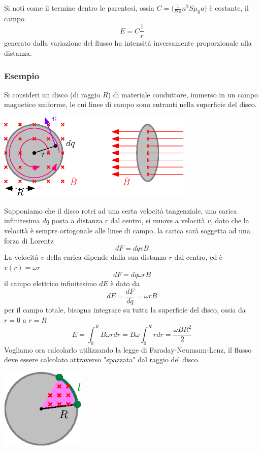 \documentclass[10pt, letterpaper]{report}
\begin{document}
Si noti come il termine dentro le parentesi, ossia $C=\Big(\frac{1}{l2\pi }n^2S\mu_0a\Big)$ è costante, il campo $$ E=C\frac{1}{r}$$
generato dalla variazione del flusso ha intensità inversamente proporzionale alla distanza. 
\subsubsection{Esempio}
Si consideri un disco (di raggio $R$) di materiale conduttore, immerso in un campo magnetico uniforme, le cui linee di campo sono entranti nella superficie del disco.\begin{center}
    \includegraphics[width=0.7\textwidth ]{images/discoMagnetico.eps}
\end{center}
Supponiamo che il disco rotei ad una certa velocità tangenziale, una carica infinitesima $dq$ posta a distanza $r$ dal centro, si muove a velocità $v$, dato che la velocità è sempre ortogonale alle linee di campo, la carica sarà soggetta ad una forza di Lorentz 
$$ dF=dqvB$$
La velocità $v$ della carica dipende dalla sua distanza $r$ dal centro, ed è $v(r)=\omega r$
$$ dF=dq\omega rB$$
il campo elettrico infinitesimo $dE$ è dato da 
$$ dE = \frac{dF}{dq}=\omega rB$$
per il campo totale, bisogna integrare su tutta la superficie del disco, ossia da $r=0$ a $r=R$ 
$$ E=\int_0^R B\omega r  dr =B\omega \int_0^R  r  dr=\frac{\omega B R^2}{2}  $$
Vogliamo ora calcolarlo utilizzando la legge di Faraday-Neumann-Lenz, il flusso deve essere calcolato attraverso "spazzata" dal raggio del disco.\begin{center}
    \includegraphics[width=0.3\textwidth ]{images/discoMagnetico2.eps}
\end{center}
\end{document}
